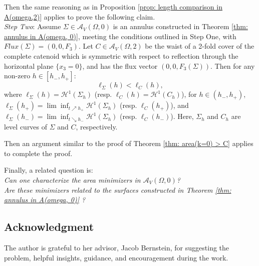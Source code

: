 \documentclass[11pt]{amsart}
\numberwithin{equation}{section}
\theoremstyle{theorem}
\theoremstyle{definition}
\numberwithin{equation}{section}
\begin{document}
Then the same reasoning as in Proposition \ref{prop: length comparison in A(omega,2)} applies to prove the following claim.\\
\textit{Step Two}:
     Assume $\Sigma \in \mathcal{A}_V(\Omega ,0)$ is an annulus constructed in Theorem \ref{thm: annulus in A(omega, 0)}, meeting the conditions outlined in Step One, with $Flux(\Sigma)=(0,0,F_3)$. Let $C \in \mathcal{A}_V(\Omega ,2)$ be the waist of a 2-fold cover of the complete catenoid which is symmetric with respect to reflection through the horizontal plane $\{ x_3=0\}$, and has the flux vector $(0,0,F_3(\Sigma))$. Then for any non-zero $h\in [h_-,h_+]$: 
     $$\ell_{\Sigma}(h)<\ell_{C}(h),$$
     where $\ell_{\Sigma}(h)=\mathcal{H}^1(\Sigma_h)$ (resp. $\ell_C(h)=\mathcal{H}^1(C_h)$), for $h\in (h_-,h_+)$, \\ $\ell_{\Sigma}(h_+)=\lim \inf_{t\nearrow h_+}  \mathcal{H}^1(\Sigma_h)$ (resp.  $\ell_{C}(h_+)$), and $\ell_{\Sigma}(h_-)=\lim \inf_{t\searrow h_-}  \mathcal{H}^1(\Sigma_h)$ (resp.  $\ell_{C}(h_-)$). Here, $\Sigma_h$ and $C_h$ are level curves of $\Sigma$ and $C$, respectively.
\medskip

Then an argument similar to the proof of Theorem \ref{thm: area(k=0) > C} applies to complete the proof.
\medskip

Finally, a related question is:\\

\textit{Can one characterize the area minimizers in $\mathcal{A}_V(\Omega ,0)$? \\
Are these minimizers related to the surfaces constructed in Theorem \ref{thm: annulus in A(omega, 0)} ?}

\subsection*{Acknowledgment}
The author is grateful to her advisor, Jacob Bernstein, for suggesting the problem, helpful insights, guidance, and encouragement during the work.



%

\providecommand{\bysame}{\leavevmode\hbox to3em{\hrulefill}\thinspace}
\providecommand{\MR}{\relax\ifhmode\unskip\space\fi MR }
\providecommand{\MRhref}[2]{%
  \href{http://www.ams.org/mathscinet-getitem?mr=#1}{#2}
}
\providecommand{\href}[2]{#2}
\end{document}
